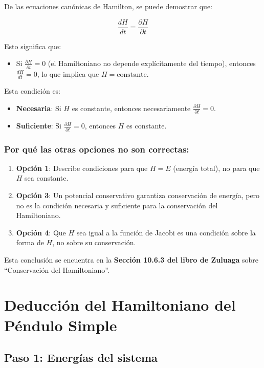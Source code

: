 \documentclass[a4paper]{article}
\begin{document}
De las ecuaciones canónicas de Hamilton, se puede demostrar que:

\begin{equation*}
\frac{dH}{dt} = \frac{\partial H}{\partial t}
\end{equation*}

Esto significa que:
\begin{itemize}
    \item Si $\frac{\partial H}{\partial t} = 0$ (el Hamiltoniano no depende explícitamente del tiempo), entonces $\frac{dH}{dt} = 0$, lo que implica que $H = \text{constante}$.
\end{itemize}

Esta condición es:
\begin{itemize}
    \item \textbf{Necesaria}: Si $H$ es constante, entonces necesariamente $\frac{\partial H}{\partial t} = 0$.
    \item \textbf{Suficiente}: Si $\frac{\partial H}{\partial t} = 0$, entonces $H$ es constante.
\end{itemize}

\subsubsection*{Por qué las otras opciones no son correctas:}

\begin{enumerate}
    \item \textbf{Opción 1}: Describe condiciones para que $H = E$ (energía total), no para que $H$ sea constante.
    \item \textbf{Opción 3}: Un potencial conservativo garantiza conservación de energía, pero no es la condición necesaria y suficiente para la conservación del Hamiltoniano.
    \item \textbf{Opción 4}: Que $H$ sea igual a la función de Jacobi es una condición sobre la forma de $H$, no sobre su conservación.
\end{enumerate}

Esta conclusión se encuentra en la \textbf{Sección 10.6.3 del libro de Zuluaga} sobre ``Conservación del Hamiltoniano''.


\section*{Deducción del Hamiltoniano del Péndulo Simple}

\subsection*{Paso 1: Energías del sistema}
\end{document}
